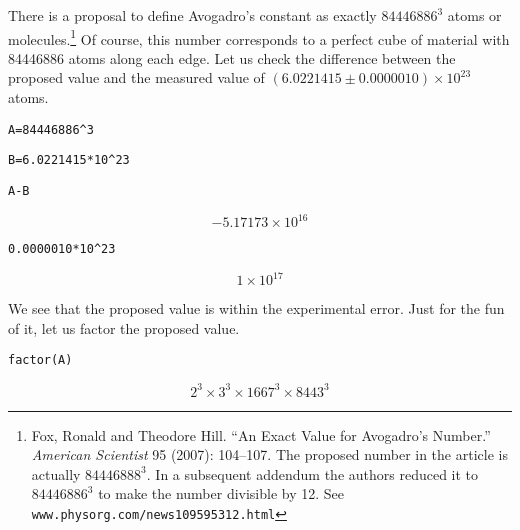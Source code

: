 \noindent
There is a proposal to define Avogadro's constant as exactly $84446886^3$
atoms or molecules.\footnote{Fox, Ronald and Theodore Hill.
``An Exact Value for Avogadro's Number.''
{\it American Scientist} 95 (2007): 104--107.
The proposed number in the article is actually $84446888^3$.
In a subsequent addendum the authors reduced it to $84446886^3$ to make the
number divisible by 12. See {\tt www.physorg.com/news109595312.html}}
Of course, this number corresponds to a perfect cube of material with 84446886
atoms along each edge.
Let us check the difference between the proposed value and the measured value
of $(6.0221415\pm0.0000010)\times10^{23}$ atoms.

\medskip
\verb$A=84446886^3$

\verb$B=6.0221415*10^23$

\verb$A-B$

$$-5.17173\times10^{16}$$

\verb$0.0000010*10^23$

$$1\times10^{17}$$

\medskip
\noindent
We see that the proposed value is within the experimental error.
Just for the fun of it, let us factor the proposed value.

\medskip
\verb$factor(A)$

$$2^3\times3^3\times1667^3\times8443^3$$

